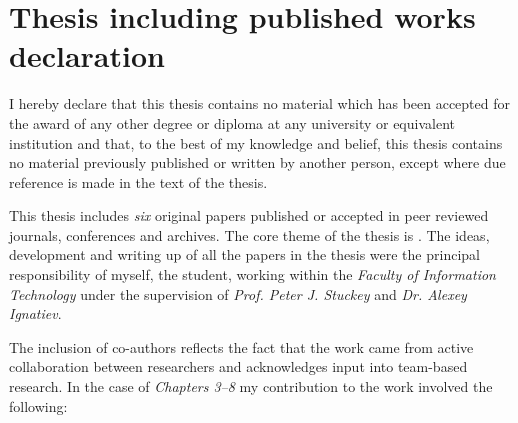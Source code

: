 \section*{Thesis including published works declaration}



I hereby declare that this thesis contains no material which has been accepted for the award of any other degree or diploma at any university or equivalent institution and that, to the best of my knowledge and belief, this thesis contains no material previously published or written by another person, except where due reference is made in the text of the
thesis.

This thesis includes \emph{six} original papers published or accepted in peer reviewed journals, conferences
and archives. %
%
The core theme of the thesis is \emph{\thesistopic}.
%
The ideas, development and writing up of all the papers in the thesis were the principal responsibility of myself, the student, working within the
\emph{Faculty of Information Technology} under the  supervision of \emph{Prof. Peter J. Stuckey}
and \emph{Dr. Alexey Ignatiev}.

The inclusion of co-authors reflects the fact that the work came from active collaboration between researchers and acknowledges input into team-based research.
%
In the case of \emph{Chapters 3--8} my contribution to the work involved the following:


